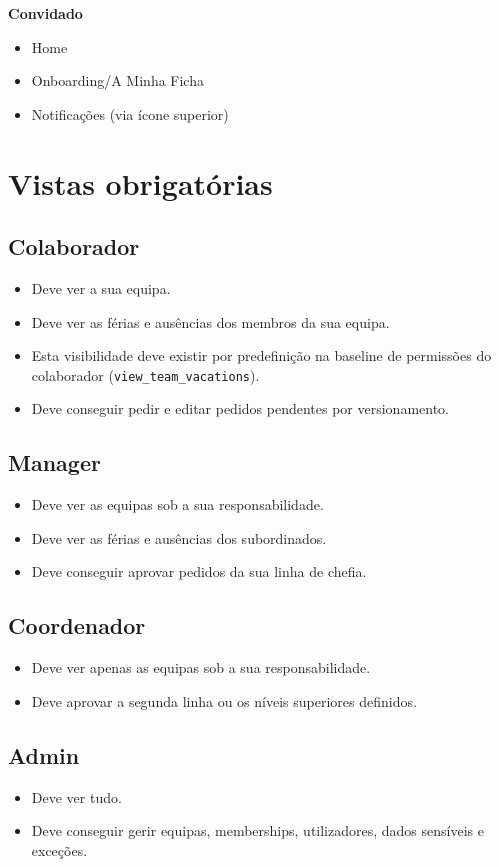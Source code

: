 \documentclass[11pt,a4paper]{article}
\begin{document}
\textbf{Convidado}
\begin{itemize}
  \item Home
  \item Onboarding/A Minha Ficha
  \item Notificações (via ícone superior)
\end{itemize}

\section{Vistas obrigatórias}

\subsection{Colaborador}
\begin{itemize}
  \item Deve ver a sua equipa.
  \item Deve ver as férias e ausências dos membros da sua equipa.
  \item Esta visibilidade deve existir por predefinição na baseline de permissões do colaborador (\texttt{view\_team\_vacations}).
  \item Deve conseguir pedir e editar pedidos pendentes por versionamento.
\end{itemize}

\subsection{Manager}
\begin{itemize}
  \item Deve ver as equipas sob a sua responsabilidade.
  \item Deve ver as férias e ausências dos subordinados.
  \item Deve conseguir aprovar pedidos da sua linha de chefia.
\end{itemize}

\subsection{Coordenador}
\begin{itemize}
  \item Deve ver apenas as equipas sob a sua responsabilidade.
  \item Deve aprovar a segunda linha ou os níveis superiores definidos.
\end{itemize}

\subsection{Admin}
\begin{itemize}
  \item Deve ver tudo.
  \item Deve conseguir gerir equipas, memberships, utilizadores, dados sensíveis e exceções.
\end{itemize}
\end{document}

